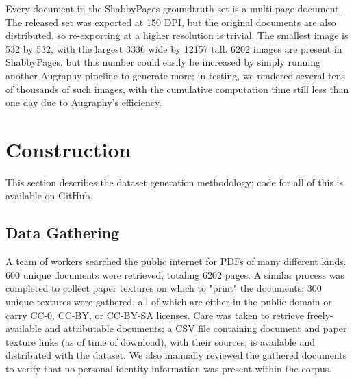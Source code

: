 \documentclass[runningheads]{llncs}
\begin{document}


Every document in the ShabbyPages groundtruth set is a multi-page document.
The released set was exported at 150 DPI, but the original documents are also distributed, so re-exporting at a higher resolution is trivial.
The smallest image is 532 by 532, with the largest 3336 wide by 12157 tall.
6202 images are present in ShabbyPages, but this number could easily be increased by simply running another Augraphy pipeline to generate more; in testing, we rendered several tens of thousands of such images, with the cumulative computation time still less than one day due to Augraphy's efficiency.

\section{Construction}
This section describes the dataset generation methodology; code for all of this is available on GitHub.

\subsection{Data Gathering}
A team of workers searched the public internet for PDFs of many different kinds.
600 unique documents were retrieved, totaling 6202 pages.
A similar process was completed to collect paper textures on which to "print" the documents: 300 unique textures were gathered, all of which are either in the public domain or carry CC-0, CC-BY, or CC-BY-SA licenses.
Care was taken to retrieve freely-available and attributable documents; a CSV file containing document and paper texture links (as of time of download), with their sources, is available and distributed with the dataset.
We also manually reviewed the gathered documents to verify that no personal identity information was present within the corpus.
\end{document}
